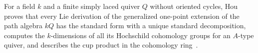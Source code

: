 For a field $k$ and a finite simply laced quiver $Q$ without oriented cycles, Hou proves that every Lie derivation of the generalized one-point extension of the path algebra $kQ$ has the standard form with a unique standard decomposition, computes the $k$-dimensions of all its Hochschild cohomology groups for an $A$-type quiver, and describes the cup product in the cohomology ring~\cite{WlLieDerivationAndHochschildCoho2016}.
